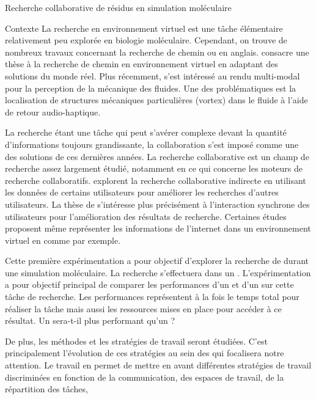 \documentclass[myfrancais]{mythesis}
\begin{document}
\begin{mychapter}{Recherche collaborative de résidus en simulation moléculaire}
\begin{mysection}{Contexte}
			La recherche en environnement virtuel est une tâche élémentaire relativement peu explorée en biologie moléculaire.
			Cependant, on trouve de nombreux travaux concernant la \og recherche de chemin \fg ou  en anglais.
			 consacre une thèse à la recherche de chemin en environnement virtuel en adaptant des solutions du monde réel.
			Plus récemment,  s'est intéressé au rendu multi-modal pour la perception de la mécanique des fluides.
			Une des problématiques est la localisation de structures mécaniques particulières (vortex) dans le fluide à l'aide de retour audio-haptique.

			La recherche étant une tâche qui peut s'avérer complexe devant la quantité d'informations toujours grandissante, la collaboration s'est imposé comme une des solutions de ces dernières années.
			La recherche collaborative est un champ de recherche assez largement étudié, notamment en ce qui concerne les moteurs de recherche collaboratifs.
			 explorent la recherche collaborative indirecte en utilisant les données de certains utilisateurs pour améliorer les recherches d'autres utilisateurs.
			La thèse de  s'intéresse plus précisément à l'interaction synchrone des utilisateurs pour l'amélioration des résultats de recherche.
			Certaines études proposent même représenter les informations de l'internet dans un environnement virtuel en \myThreeD comme  par exemple.

			Cette première expérimentation a pour objectif d'explorer la recherche de  durant une simulation moléculaire.
			La recherche s'effectuera dans un .
			L'expérimentation a pour objectif principal de comparer les performances d'un  et d'un  sur cette tâche de recherche.
			Les performances représentent à la fois le temps total pour réaliser la tâche mais aussi les ressources mises en place pour accéder à ce résultat.
			Un  sera-t-il plus performant qu'un  ?

			De plus, les méthodes et les stratégies de travail seront étudiées.
			C'est principalement l'évolution de ces stratégies au sein des  qui focalisera notre attention.
			Le travail en  permet de mettre en avant différentes stratégies de travail discriminées en fonction de la communication, des espaces de travail, de la répartition des tâches, \myetc


\end{mysection}
\end{mychapter}
\end{document}
